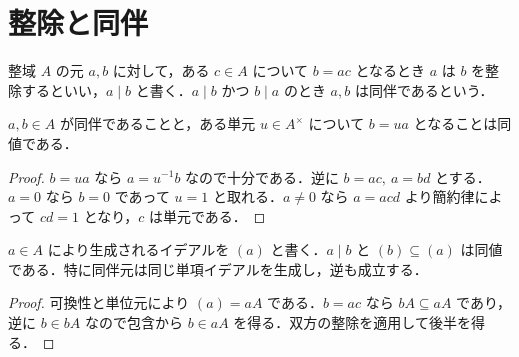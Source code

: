 \section{整除と同伴}
\begin{defn}[整除と同伴元]
整域 $A$ の元 $a,b$ に対して，ある $c\in A$ について $b=ac$ となるとき $a$ は $b$ を整除するといい，$a\mid b$ と書く．$a\mid b$ かつ $b\mid a$ のとき $a,b$ は同伴であるという．
\end{defn}
\begin{prop}[同伴元と単元]
$a,b\in A$ が同伴であることと，ある単元 $u\in A^\times$ について $b=ua$ となることは同値である．
\end{prop}
\begin{proof}
$b=ua$ なら $a=u^{-1}b$ なので十分である．逆に $b=ac,\ a=bd$ とする．$a=0$ なら $b=0$ であって $u=1$ と取れる．$a\ne0$ なら $a=acd$ より簡約律によって $cd=1$ となり，$c$ は単元である．
\end{proof}
\begin{prop}[整除と単項イデアル]
$a\in A$ により生成されるイデアルを $(a)$ と書く．$a\mid b$ と $(b)\subseteq(a)$ は同値である．特に同伴元は同じ単項イデアルを生成し，逆も成立する．
\end{prop}
\begin{proof}
可換性と単位元により $(a)=aA$ である．$b=ac$ なら $bA\subseteq aA$ であり，逆に $b\in bA$ なので包含から $b\in aA$ を得る．双方の整除を適用して後半を得る．
\end{proof}
